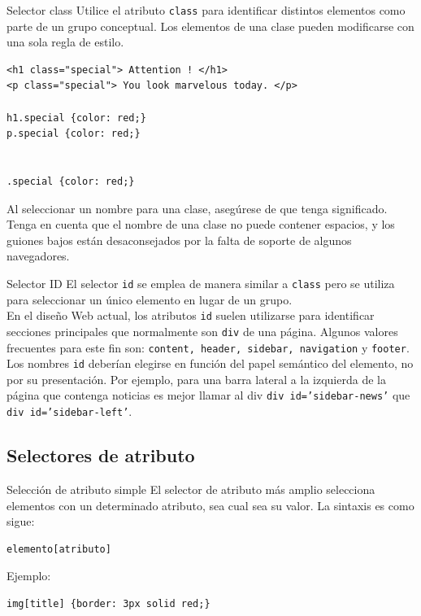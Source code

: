 \begin{frame}[fragile]{Selector class} %
    Utilice el atributo \texttt{class} para identificar distintos elementos
    como parte de un grupo conceptual. Los elementos de una clase pueden
    modificarse con una sola regla de estilo. 
    \begin{lstlisting}
<h1 class="special"> Attention ! </h1> 
<p class="special"> You look marvelous today. </p> 

h1.special {color: red;}
p.special {color: red;} 


.special {color: red;}
    \end{lstlisting}

    Al seleccionar un nombre para una clase, asegúrese de que tenga
    significado. Tenga en cuenta que el nombre de una clase no puede contener
    espacios, y los guiones bajos están desaconsejados por la falta de soporte
    de algunos navegadores.

\end{frame}

\begin{frame}{Selector ID} %
    El selector \texttt{id} se emplea de manera similar a \texttt{class} pero
    se utiliza para seleccionar un único elemento en lugar de un grupo. \\[0.5cm]

    En el diseño Web actual, los atributos \texttt{id} suelen utilizarse para
    identificar secciones principales que normalmente son \texttt{div} de una
    página. Algunos valores frecuentes para este fin son: \texttt{content,
    header, sidebar, navigation} y \texttt{footer}.\\[0.5cm] 

    Los nombres \texttt{id} deberían elegirse en función del papel semántico
    del elemento, no por su presentación. Por ejemplo, para una barra lateral a
    la izquierda de la página que contenga noticias es mejor llamar al div
    \texttt{div id='sidebar-news'} que \texttt{div id='sidebar-left'}.
\end{frame}


\subsection{Selectores de atributo} %

\begin{frame}[fragile]{Selección de atributo simple} %
    El selector de atributo más amplio selecciona elementos con un determinado
    atributo, sea cual sea su valor. La sintaxis es como sigue: 

    \begin{lstlisting}
elemento[atributo]
    \end{lstlisting}

    Ejemplo: 
\begin{lstlisting}
img[title] {border: 3px solid red;}
\end{lstlisting}
\end{frame}

